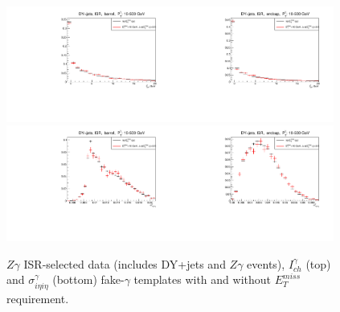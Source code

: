 \begin{figure}[htb]
  \begin{center}
  \includegraphics[width=0.48\textwidth]{../figs/figs_v11/ChannelsMERGED_ZGamma/QuickChecks/cTemplatesVsWMt_ZjetsISR_phoPFChIsoCorr_BARREL_pt10to500.pdf}\includegraphics[width=0.48\textwidth]{../figs/figs_v11/ChannelsMERGED_ZGamma/QuickChecks/cTemplatesVsWMt_ZjetsISR_phoPFChIsoCorr_ENDCAP_pt10to500.pdf}\\
  \includegraphics[width=0.48\textwidth]{../figs/figs_v11/ChannelsMERGED_ZGamma/QuickChecks/cTemplatesVsWMt_ZjetsISR_phoSigmaIEtaIEta_BARREL_pt10to500.pdf}\includegraphics[width=0.48\textwidth]{../figs/figs_v11/ChannelsMERGED_ZGamma/QuickChecks/cTemplatesVsWMt_ZjetsISR_phoSigmaIEtaIEta_ENDCAP_pt10to500.pdf}\\
  \caption{$Z\gamma$ ISR-selected data (includes DY+jets and $Z\gamma$ events), $I_{ch}^\gamma$ (top) and $\sigma_{i \eta i \eta}^\gamma$ (bottom) fake-$\gamma$ templates with and without $E_T^{miss}$ requirement.}
  \label{fig:templatesVsWMt_Zg_CHISO_fake}
  \end{center}
\end{figure}

